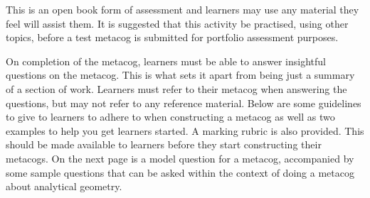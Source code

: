 This is an open book form of assessment and learners may use any material they feel will assist them. It is suggested that this activity be practised, using other topics, before a test metacog is submitted for portfolio assessment purposes. \par

On completion of the metacog, learners must be able to answer insightful questions on the metacog. This is what sets it apart from being just a summary of a section of work. Learners must refer to their metacog when answering the questions, but may not refer to any reference material. Below are some guidelines to give to learners to adhere to when constructing a metacog as well as two examples to help you get learners started. A marking rubric is also provided. This should be made available to learners before they start constructing their metacogs. On the next page is a model question for a metacog, accompanied by some sample questions that can be asked within the context of doing a metacog about analytical geometry. \par

